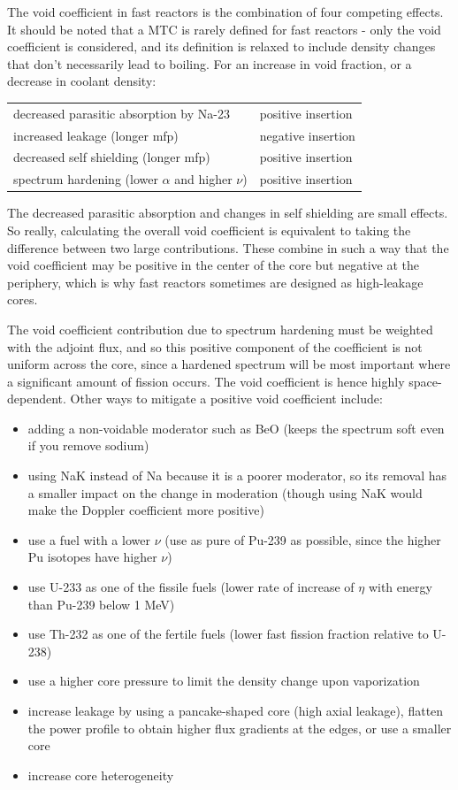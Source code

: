 \documentclass[10pt]{article}
\begin{document}
\begin{flushleft}
The void coefficient in fast reactors is the combination of four competing effects. It should be noted that a MTC is rarely defined for fast reactors - only the void coefficient is considered, and its definition is relaxed to include density changes that don't necessarily lead to boiling. For an increase in void fraction, or a decrease in coolant density:

\begin{center}
\begin{tabular}{l l}
decreased parasitic absorption by Na-23 & positive insertion\\
increased leakage (longer mfp) & negative insertion\\
decreased self shielding (longer mfp) & positive insertion\\
spectrum hardening (lower \(\alpha\) and higher \(\nu\)) & positive insertion\\
\end{tabular}
\end{center}

The decreased parasitic absorption and changes in self shielding are small effects. So really, calculating the overall void coefficient is equivalent to taking the difference between two large contributions. These combine in such a way that the void coefficient may be positive in the center of the core but negative at the periphery, which is why fast reactors sometimes are designed as high-leakage cores. 

The void coefficient contribution due to spectrum hardening must be weighted with the adjoint flux, and so this positive component of the coefficient is not uniform across the core, since a hardened spectrum will be most important where a significant amount of fission occurs. The void coefficient is hence highly space-dependent. Other ways to mitigate a positive void coefficient include:

\begin{itemize}
\item adding a non-voidable moderator such as BeO (keeps the spectrum soft even if you remove sodium)
\item using NaK instead of Na because it is a poorer moderator, so its removal has a smaller impact on the change in moderation (though using NaK would make the Doppler coefficient more positive)
\item use a fuel with a lower \(\nu\) (use as pure of Pu-239 as possible, since the higher Pu isotopes have higher \(\nu\))
\item use U-233 as one of the fissile fuels (lower rate of increase of \(\eta\) with energy than Pu-239 below 1 MeV)
\item use Th-232 as one of the fertile fuels (lower fast fission fraction relative to U-238)
\item use a higher core pressure to limit the density change upon vaporization
\item increase leakage by using a pancake-shaped core (high axial leakage), flatten the power profile to obtain higher flux gradients at the edges, or use a smaller core
\item increase core heterogeneity
\end{itemize}


\end{flushleft}
\end{document}
